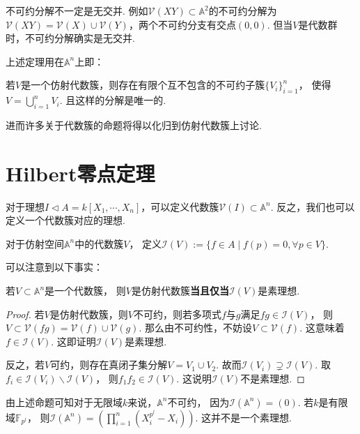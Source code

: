     \begin{remark}
        不可约分解不一定是无交并. 例如$\mathcal{V}(XY) \subset \mathbb{A}^{2}$的不可约分解为
        $\mathcal{V}(XY) = \mathcal{V}(X) \cup \mathcal{V}(Y)$，两个不可约分支有交点$(0,0)$. 
        但当$V$是代数群时，不可约分解确实是无交并.
    \end{remark}

    上述定理用在$\mathbb{A}^{n}$上即：
    \begin{corollary}
        若$V$是一个仿射代数簇，则存在有限个互不包含的不可约子簇$\{V_{i}\}_{i=1}^{n}$，
        使得$V=\bigcup_{i=1}^{n}V_{i}$. 且这样的分解是唯一的.
    \end{corollary}

    进而许多关于代数簇的命题将得以化归到仿射代数簇上讨论.
    

\section*{Hilbert零点定理}
    对于理想$I \lhd A=k[X_{1},\cdots,X_{n}]$，可以定义代数簇$\mathcal{V}(I) \subset \mathbb{A}^{n}$.
    反之，我们也可以定义一个代数簇对应的理想.
    \begin{definition}[定义理想]
        对于仿射空间$\mathbb{A}^{n}$中的代数簇$V$，
        定义$\mathcal{I}(V):=\{f \in A \mid f(p)=0 , \forall p \in V\}$.     
    \end{definition}

    可以注意到以下事实：
    \begin{proposition}\label{prime}
        若$V \subset \mathbb{A}^{n}$是一个代数簇，
        则$V$是仿射代数簇\textbf{当且仅当}$\mathcal{I}(V)$是素理想.
    \end{proposition}
    \begin{proof}
        若$V$是仿射代数簇，则$V$不可约，则若多项式$f$与$g$满足$fg \in \mathcal{I}(V)$，
        则$V \subset \mathcal{V}(fg) = \mathcal{V}(f) \cup \mathcal{V}(g)$. 
        那么由不可约性，不妨设$V \subset \mathcal{V}(f)$.
        这意味着$f \in \mathcal{I}(V)$. 这即证明$\mathcal{I}(V)$是素理想. 

        反之，若$V$可约，则存在真闭子集分解$V=V_{1} \cup V_{2}$. 
        故而$\mathcal{I}(V_{i}) \supsetneq \mathcal{I}(V)$. 
        取$f_{i} \in \mathcal{I}(V_{i}) \backslash \mathcal{I}(V)$，
        则$f_{1}f_{2} \in \mathcal{I}(V)$. 这说明$\mathcal{I}(V)$不是素理想.
    \end{proof}

    \begin{remark}
        由上述命题可知对于无限域$k$来说，$\mathbb{A}^{n}$不可约，
        因为$\mathcal{I}(\mathbb{A}^{n})=(0)$.
        若$k$是有限域$\mathbb{F}_{p^{l}}$，
        则$\mathcal{I}(\mathbb{A}^{n})=(\prod_{i=1}^{n}(X_{i}^{p^{l}}-X_{i}))$. 这并不是一个素理想.
      \end{remark}

